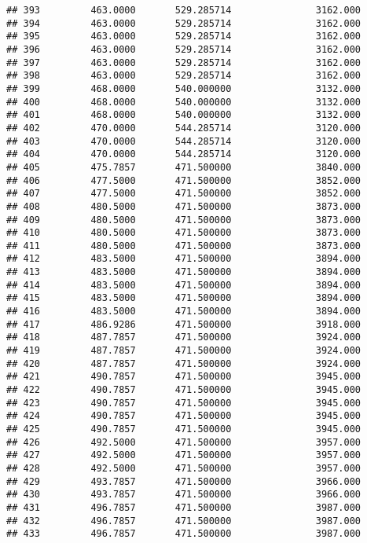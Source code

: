 \documentclass[]{article}
\begin{document}
\begin{verbatim}
## 393         463.0000       529.285714               3162.000
## 394         463.0000       529.285714               3162.000
## 395         463.0000       529.285714               3162.000
## 396         463.0000       529.285714               3162.000
## 397         463.0000       529.285714               3162.000
## 398         463.0000       529.285714               3162.000
## 399         468.0000       540.000000               3132.000
## 400         468.0000       540.000000               3132.000
## 401         468.0000       540.000000               3132.000
## 402         470.0000       544.285714               3120.000
## 403         470.0000       544.285714               3120.000
## 404         470.0000       544.285714               3120.000
## 405         475.7857       471.500000               3840.000
## 406         477.5000       471.500000               3852.000
## 407         477.5000       471.500000               3852.000
## 408         480.5000       471.500000               3873.000
## 409         480.5000       471.500000               3873.000
## 410         480.5000       471.500000               3873.000
## 411         480.5000       471.500000               3873.000
## 412         483.5000       471.500000               3894.000
## 413         483.5000       471.500000               3894.000
## 414         483.5000       471.500000               3894.000
## 415         483.5000       471.500000               3894.000
## 416         483.5000       471.500000               3894.000
## 417         486.9286       471.500000               3918.000
## 418         487.7857       471.500000               3924.000
## 419         487.7857       471.500000               3924.000
## 420         487.7857       471.500000               3924.000
## 421         490.7857       471.500000               3945.000
## 422         490.7857       471.500000               3945.000
## 423         490.7857       471.500000               3945.000
## 424         490.7857       471.500000               3945.000
## 425         490.7857       471.500000               3945.000
## 426         492.5000       471.500000               3957.000
## 427         492.5000       471.500000               3957.000
## 428         492.5000       471.500000               3957.000
## 429         493.7857       471.500000               3966.000
## 430         493.7857       471.500000               3966.000
## 431         496.7857       471.500000               3987.000
## 432         496.7857       471.500000               3987.000
## 433         496.7857       471.500000               3987.000

\end{verbatim}
\end{document}
